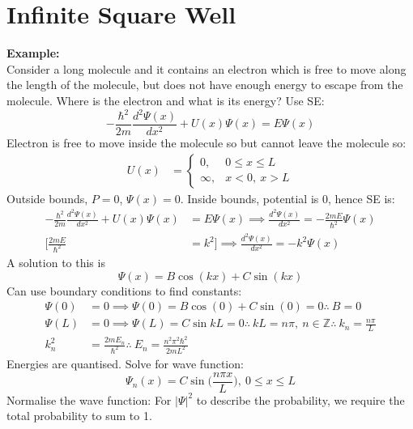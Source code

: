 \documentclass[a4paper, 11pt, normalem]{report}
\begin{document}
\section{Infinite Square Well}
\textbf{Example:}\\
Consider a long molecule and it contains an electron which is free to move along the length of the molecule, but does not have enough energy to escape from the molecule.
Where is the electron and what is its energy? 
Use SE:
\begin{equation}
     -\frac{\hbar^{2}}{2m}\frac{d^{2} \Psi(x)}{d x^{2}} + U(x)\Psi(x) = E\Psi(x)
\end{equation}
Electron is free to move inside the molecule so but cannot leave the molecule so:
\begin{align}
    U(x) &=
    \begin{cases}
        0,      & 0 \leq x \leq L \\
        \infty, & x < 0,~x > L
    \end{cases}
\end{align}
Outside bounds, $P = 0$, $\Psi(x) = 0$.
Inside bounds, potential is 0, hence SE is:
\begin{align}
    -\frac{\hbar^{2}}{2m}\frac{d^{2} \Psi(x)}{d x^{2}} + U(x)\Psi(x) &= E\Psi(x) \implies \frac{d^{2} \Psi(x)}{d x^{2}} = -\frac{2mE}{\hbar^{2}}\Psi(x) \\
    \Big[\frac{2mE}{\hbar^{2}} &= k^{2}\Big] \implies \frac{d^{2} \Psi(x)}{d x^{2}} = -k^{2}\Psi(x)
\end{align}
A solution to this is
\begin{equation}
    \Psi(x) = B\cos(kx) + C\sin(kx)
\end{equation}
Can use boundary conditions to find constants:
\begin{align}
    \Psi(0) &= 0 \implies \Psi(0) = B\cos(0) + C\sin(0) = 0  \therefore ~ B = 0 \\
    \Psi(L) &= 0 \implies \Psi(L) = C\sin{kL} = 0 \therefore ~ kL = n\pi,~n \in \mathbb{Z} \therefore ~ k_{n} = \frac{n\pi}{L} \\
    k_{n}^{2} &= \frac{2mE_{n}}{\hbar^{2}} \therefore ~ E_{n} = \frac{n^{2}\pi^{2}\hbar^{2}}{2mL^{2}}
\end{align}
Energies are quantised.
Solve for wave function:
\begin{equation}
    \Psi_{n}(x) = C\sin\Big(\frac{n\pi x}{L}\Big),~0 \leq x \leq L
\end{equation}
Normalise the wave function: For $|\Psi|^{2}$ to describe the probability, we require the total probability to sum to 1.
\end{document}
